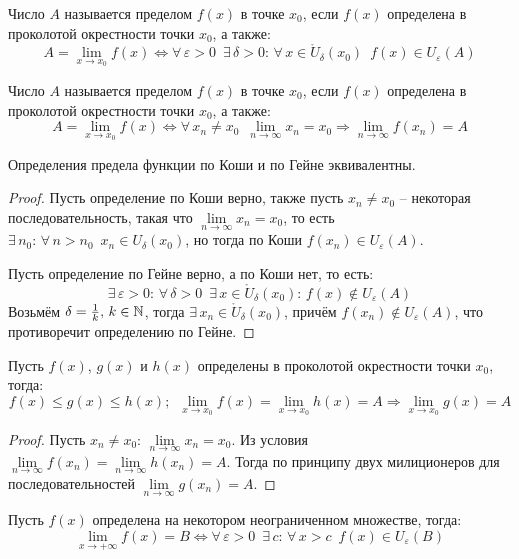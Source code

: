 \documentclass[12pt]{article}
\begin{document}
\begin{definition}
    Число $A$ называется пределом $f(x)$ в точке $x_0$, если $f(x)$ определена в проколотой окрестности точки $x_0$, а также:
    $$A=\lim_{x\to x_0}f(x)\Longleftrightarrow\forall\,\varepsilon>0\enspace \exists\,\delta>0:\, \forall\,x\in \mathring{U}_\delta(x_0)\enspace f(x)\in U_\varepsilon(A)$$
\end{definition}
\begin{definition}
    Число $A$ называется пределом $f(x)$ в точке $x_0$, если $f(x)$ определена в проколотой окрестности точки $x_0$, а также:
    $$A=\lim_{x\to x_0}f(x)\Longleftrightarrow\forall\,x_n\neq x_0\enspace \lim_{n\to\infty}x_n=x_0\Longrightarrow \lim_{n\to\infty}f(x_n)=A$$
\end{definition}
\begin{statement}
    Определения предела функции по Коши и по Гейне эквивалентны.
\end{statement}
\begin{proof}
    Пусть определение по Коши верно, также пусть $x_n\neq x_0$ -- некоторая последовательность, такая что $\lim\limits_{n\to\infty}x_n=x_0$, то есть $\exists\,n_0:\,\forall\,n>n_0\enspace x_n\in U_\delta(x_0)$, но тогда по Коши $f(x_n)\in U_\varepsilon(A)$.\bigskip

    Пусть определение по Гейне верно, а по Коши нет, то есть:
    $$\exists\,\varepsilon>0:\,\forall\,\delta>0\enspace\exists\,x\in\mathring{U}_\delta(x_0):\,f(x)\notin U_\varepsilon(A)$$
    Возьмём $\delta=\frac{1}{k},\,k\in\mathbb{N}$, тогда $\exists\,x_n\in\mathring{U}_\delta(x_0)$, причём $f(x_n)\notin U_\varepsilon(A)$, что противоречит определению по Гейне.
\end{proof}
\begin{theorem}
    Пусть $f(x)$, $g(x)$ и $h(x)$ определены в проколотой окрестности точки $x_0$, тогда:
    $$f(x)\leq g(x)\leq h(x);\enspace \lim_{x\to x_0}f(x)=\lim_{x\to x_0}h(x)=A\Longrightarrow \lim_{x\to x_0}g(x)=A$$
\end{theorem}
\begin{proof}
    Пусть $x_n\neq x_0:\,\lim\limits_{n\to\infty}x_n=x_0$. Из условия $\lim\limits_{n\to\infty}f(x_n)=\lim\limits_{n\to\infty}h(x_n)=A$. Тогда по принципу двух милиционеров для последовательностей $\lim\limits_{n\to\infty}g(x_n)=A$.
\end{proof}
\begin{definition}
    Пусть $f(x)$ определена на некотором неограниченном множестве, тогда:
    $$\lim_{x\to+\infty}f(x)=B\Longleftrightarrow \forall\,\varepsilon>0\enspace\exists\,c:\,\forall\,x>c\enspace f(x)\in U_\varepsilon(B)$$
\end{definition}
\end{document}
